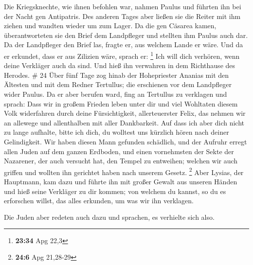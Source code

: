 Die Kriegsknechte, wie ihnen befohlen war, nahmen Paulus
und führten ihn bei der Nacht gen Antipatris.  Des anderen
Tages aber ließen sie die Reiter mit ihm ziehen und wandten wieder um
zum Lager.  Da die gen Cäsarea kamen, überantworteten sie
den Brief dem Landpfleger und stellten ihm Paulus auch dar.
 Da der Landpfleger den Brief las, fragte er, aus welchem
Lande er wäre. Und da er erkundet, dass er aus Zilizien wäre, sprach er:
\footnote{\textbf{23:34} Apg 22,3}  Ich will dich verhören,
wenn deine Verkläger auch da sind. Und hieß ihn verwahren in dem
Richthause des Herodes. \# 24  Über fünf Tage zog hinab der
Hohepriester Ananias mit den Ältesten und mit dem Redner Tertullus; die
erschienen vor dem Landpfleger wider Paulus.  Da er aber
berufen ward, fing an Tertullus zu verklagen und sprach: 
Dass wir in großem Frieden leben unter dir und viel Wohltaten diesem
Volk widerfahren durch deine Fürsichtigkeit, allerteuerster Felix, das
nehmen wir an allewege und allenthalben mit aller Dankbarkeit.
 Auf dass ich aber dich nicht zu lange aufhalte, bitte ich
dich, du wolltest uns kürzlich hören nach deiner Gelindigkeit.
 Wir haben diesen Mann gefunden schädlich, und der Aufruhr
erregt allen Juden auf dem ganzen Erdboden, und einen vornehmsten der
Sekte der Nazarener,  der auch versucht hat, den Tempel zu
entweihen; welchen wir auch griffen und wollten ihn gerichtet haben nach
unserem Gesetz. \footnote{\textbf{24:6} Apg 21,28-29}  Aber
Lysias, der Hauptmann, kam dazu und führte ihn mit großer Gewalt aus
unseren Händen  und hieß seine Verkläger zu dir kommen; von
welchem du kannst, so du es erforschen willst, das alles erkunden, um
was wir ihn verklagen.

 Die Juden aber redeten auch dazu und sprachen, es verhielte
sich also.

